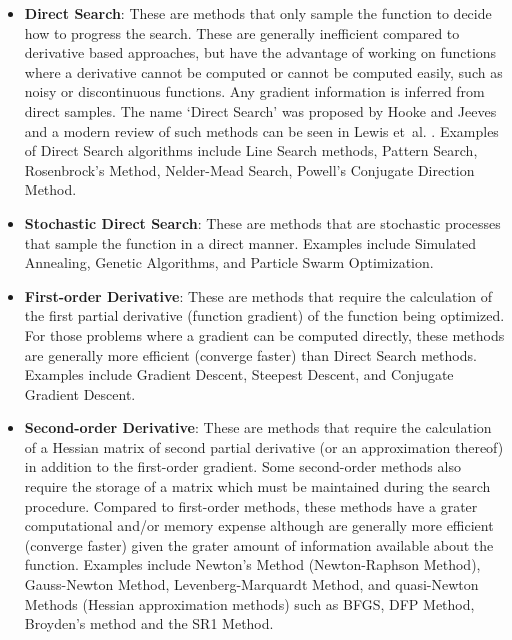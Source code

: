 \begin{bibunit}
\begin{itemize}
	\item \textbf{Direct Search}: These are methods that only sample the function to decide how to progress the search. These are generally inefficient compared to derivative based approaches, but have the advantage of working on functions where a derivative cannot be computed or cannot be computed easily, such as noisy or discontinuous functions. Any gradient information is inferred from direct samples. The name `Direct Search' was proposed by Hooke and Jeeves \cite{Hooke1961} and a modern review of such methods can be seen in Lewis et~al. \cite{Lewis2000}. Examples of Direct Search algorithms include Line Search methods, Pattern Search, Rosenbrock's Method, Nelder-Mead Search, Powell's Conjugate Direction Method.
	\item \textbf{Stochastic Direct Search}: These are methods that are stochastic processes that sample the function in a direct manner. Examples include Simulated Annealing, Genetic Algorithms, and Particle Swarm Optimization.
	\item \textbf{First-order Derivative}: These are methods that require the calculation of the first partial derivative (function gradient) of the function being optimized. For those problems where a gradient can be computed directly, these methods are generally more efficient (converge faster) than Direct Search methods. Examples include Gradient Descent, Steepest Descent, and Conjugate Gradient Descent.
	\item \textbf{Second-order Derivative}: These are methods that require the calculation of a Hessian matrix of second partial derivative (or an approximation thereof) in addition to the first-order gradient. Some second-order methods also require the storage of a matrix which must be maintained during the search procedure. Compared to first-order methods, these methods have a grater computational and/or memory expense although are generally more efficient (converge faster) given the grater amount of information available about the function. Examples include Newton's Method (Newton-Raphson Method), Gauss-Newton Method, Levenberg-Marquardt Method, and quasi-Newton Methods (Hessian approximation methods) such as BFGS, DFP Method, Broyden's method and the SR1 Method.
\end{itemize}


\end{bibunit}
